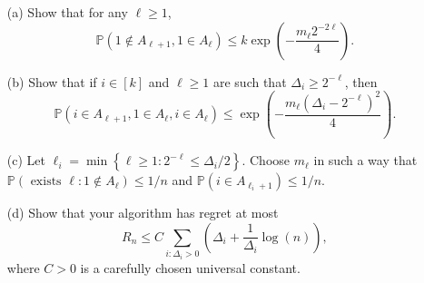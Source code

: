 \begin{enumerate}
    \item[(a)] Show that for any $\ell \geq 1$,
    $$\mathbb{P}\left(1 \notin A_{\ell+1}, 1 \in A_{\ell}\right) \leq k \exp \left(-\frac{m_{\ell} 2^{-2 \ell}}{4}\right).$$

    \item[(b)] Show that if $i \in[k]$ and $\ell \geq 1$ are such that $\Delta_{i} \geq 2^{-\ell}$, then
    $$\mathbb{P}\left(i \in A_{\ell+1}, 1 \in A_{\ell}, i \in A_{\ell}\right) \leq \exp \left(-\frac{m_{\ell}\left(\Delta_{i}-2^{-\ell}\right)^{2}}{4}\right).$$ 
    
    \item[(c)] Let $\ell_{i}=\min \left\{\ell \geq 1: 2^{-\ell} \leq \Delta_{i} / 2\right\}$.
    Choose $m_\ell$ in such a way that $\mathbb{P}\left(\text { exists } \ell: 1 \notin A_{\ell}\right) \leq 1 / n$ and $\mathbb{P}\left(i \in A_{\ell_{i}+1}\right) \leq 1 / n$.

    \item[(d)] Show that your algorithm has regret at most
    $$R_{n} \leq C \sum_{i: \Delta_{i}>0}\left(\Delta_{i}+\frac{1}{\Delta_{i}} \log (n)\right),$$
    where $C>0$ is a carefully chosen universal constant. 
\end{enumerate}

